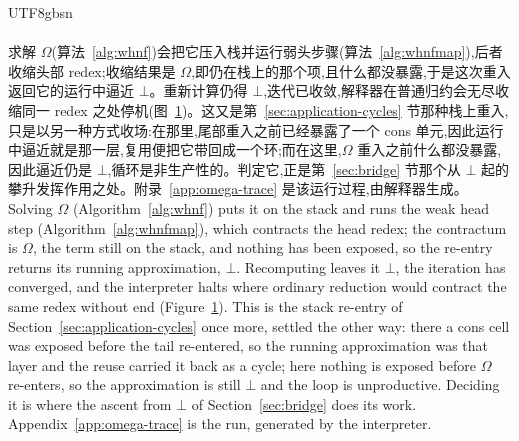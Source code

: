 \begin{CJK*}{UTF8}{gbsn}
  \paragraph{}
  \ifTablambdaChinese
  求解 $\Omega$(算法~\ref{alg:whnf})会把它压入栈并运行弱头步骤(算法~\ref{alg:whnfmap}),后者收缩头部 redex;收缩结果是 $\Omega$,即仍在栈上的那个项,且什么都没暴露,于是这次重入返回它的运行中逼近 $\bot$。重新计算仍得 $\bot$,迭代已收敛,解释器在普通归约会无尽收缩同一 redex 之处停机(图~\ref{fig:omega})。这又是第~\ref{sec:application-cycles} 节那种栈上重入,只是以另一种方式收场:在那里,尾部重入之前已经暴露了一个 cons 单元,因此运行中逼近就是那一层,复用便把它带回成一个环;而在这里,$\Omega$ 重入之前什么都没暴露,因此逼近仍是 $\bot$,循环是非生产性的。判定它,正是第~\ref{sec:bridge} 节那个从 $\bot$ 起的攀升发挥作用之处。附录~\ref{app:omega-trace} 是该运行过程,由解释器生成。
  \else
  Solving $\Omega$ (Algorithm~\ref{alg:whnf}) puts it on the stack and runs the weak head step (Algorithm~\ref{alg:whnfmap}), which contracts the head redex; the contractum is $\Omega$, the term still on the stack, and nothing has been exposed, so the re-entry returns its running approximation, $\bot$. Recomputing leaves it $\bot$, the iteration has converged, and the interpreter halts where ordinary reduction would contract the same redex without end (Figure~\ref{fig:omega}). This is the stack re-entry of Section~\ref{sec:application-cycles} once more, settled the other way: there a cons cell was exposed before the tail re-entered, so the running approximation was that layer and the reuse carried it back as a cycle; here nothing is exposed before $\Omega$ re-enters, so the approximation is still $\bot$ and the loop is unproductive. Deciding it is where the ascent from $\bot$ of Section~\ref{sec:bridge} does its work. Appendix~\ref{app:omega-trace} is the run, generated by the interpreter.
  \fi

  \begin{figure}
    \centering
    
    \caption{}
    \label{fig:omega}
  \end{figure}


\end{CJK*}
